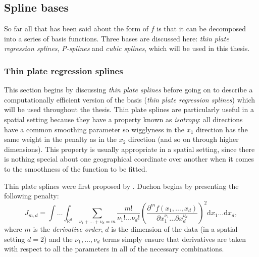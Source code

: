 \subsection{Spline bases}

So far all that has been said about the form of $f$ is that it can be decomposed into a series of basis functions. Three bases are discussed here: \textit{thin plate regression splines}, \textit{P-splines} and \textit{cubic splines}, which will be used in this thesis.

\subsubsection{Thin plate regression splines}
\label{GAMtprs}
\label{GAMtprspenalty}

This section begins by discussing \textit{thin plate splines} before going on to describe a computationally efficient version of the basis (\textit{thin plate regression splines}) which will be used throughout the thesis. Thin plate splines are particularly useful in a spatial setting because they have a property known as \textit{isotropy}: all directions have a common smoothing parameter so wigglyness in the $x_1$ direction has the same weight in the penalty as in the $x_2$ direction (and so on through higher dimensions). This property is usually appropriate in a spatial setting, since there is nothing special about one geographical coordinate over another when it comes to the smoothness of the function to be fitted.

Thin plate splines were first proposed by . Duchon begins by presenting the following penalty:
\begin{equation}
J_{m,d} = \int \ldots \int_{\mathbb{R}^d} \sum_{\nu_1 + \dots + \nu_d=m} \frac{m!}{\nu_1! \dots \nu_d!} \left ( \frac{\partial^m f(x_1,\dots,x_d)}{\partial x_1^{\nu_1} \ldots  \partial x_d^{\nu_d}} \right )^2 \text{d} x_1 \ldots  \text{d} x_d,
\label{tprs-pen}
\end{equation}
where $m$ is the \textit{derivative order}, $d$ is the dimension of the data (in a spatial setting $d=2$) and the $\nu_1,\ldots,\nu_d$ terms simply ensure that derivatives are taken with respect to all the parameters in all of the necessary combinations.

